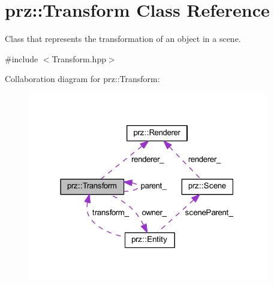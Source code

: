 \hypertarget{classprz_1_1_transform}{}\section{prz\+::Transform Class Reference}
\label{classprz_1_1_transform}


Class that represents the transformation of an object in a scene.  




{\ttfamily \#include $<$Transform.\+hpp$>$}



Collaboration diagram for prz\+::Transform\+:
\nopagebreak
\begin{figure}[H]
\begin{center}
\leavevmode
\includegraphics[width=297pt]{classprz_1_1_transform__coll__graph}
\end{center}
\end{figure}
